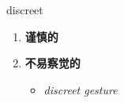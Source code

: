 
\begin{frame}
{\huge discreet}
\begin{center}
\begin{enumerate}\Large
  \item \textbf{谨慎的}
  \item \textbf{不易察觉的}
  \begin{itemize}
    \item \em{\Large{discreet gesture}}
  \end{itemize}
\end{enumerate}
\end{center}
\end{frame}
